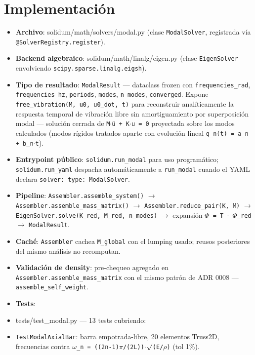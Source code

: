 \documentclass[11pt,letterpaper,oneside]{report}
\begin{document}
\section{Implementación}

\begin{itemize}
  \item \textbf{Archivo}: solidum/math/solvers/modal.py (clase \texttt{ModalSolver}, registrada vía \texttt{@SolverRegistry.register}).
  \item \textbf{Backend algebraico}: solidum/math/linalg/eigen.py (clase \texttt{EigenSolver} envolviendo \texttt{scipy.sparse.linalg.eigsh}).
  \item \textbf{Tipo de resultado}: \texttt{ModalResult} --- dataclass frozen con \texttt{frequencies\_rad}, \texttt{frequencies\_hz}, \texttt{periods}, \texttt{modes}, \texttt{n\_modes}, \texttt{converged}. Expone \texttt{free\_vibration(M, u0, u0\_dot, t)} para reconstruir analíticamente la respuesta temporal de vibración libre sin amortiguamiento por superposición modal --- solución cerrada de \texttt{M\ensuremath{\cdot}ü + K\ensuremath{\cdot}u = 0} proyectada sobre los modos calculados (modos rígidos tratados aparte con evolución lineal \texttt{q\_n(t) = a\_n + b\_n\ensuremath{\cdot}t}).
  \item \textbf{Entrypoint público}: \texttt{solidum.run\_modal} para uso programático; \texttt{solidum.run\_yaml} despacha automáticamente a \texttt{run\_modal} cuando el YAML declara \texttt{solver: type: ModalSolver}.
  \item \textbf{Pipeline}: \texttt{Assembler.assemble\_system()} \ensuremath{\to} \texttt{Assembler.assemble\_mass\_matrix()} \ensuremath{\to} \texttt{Assembler.reduce\_pair(K, M)} \ensuremath{\to} \texttt{EigenSolver.solve(K\_red, M\_red, n\_modes)} \ensuremath{\to} expansión \texttt{\ensuremath{\Phi} = T \ensuremath{\cdot} \ensuremath{\Phi}\_red} \ensuremath{\to} \texttt{ModalResult}.
  \item \textbf{Caché}: \texttt{Assembler} cachea \texttt{M\_global} con el lumping usado; reusos posteriores del mismo análisis no recomputan.
  \item \textbf{Validación de density}: pre-chequeo agregado en \texttt{Assembler.assemble\_mass\_matrix} con el mismo patrón de ADR 0008 --- \texttt{assemble\_self\_weight}.
  \item \textbf{Tests}:
  \item tests/test\_modal.py --- 13 tests cubriendo:
  \item \texttt{TestModalAxialBar}: barra empotrada-libre, 20 elementos Truss2D, frecuencias contra \texttt{\ensuremath{\omega}\_n = ((2n-1)\ensuremath{\pi}/(2L))\ensuremath{\cdot}\ensuremath{\surd}(E/\ensuremath{\rho})} (tol 1\%).

\end{itemize}
\end{document}
